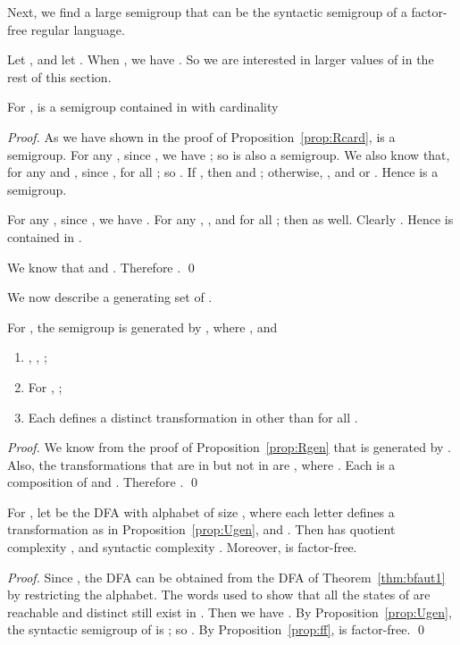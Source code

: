 \documentclass{llncs}
\newcommand{\be}{\begin{enumerate}}
\newcommand{\ee}{\end{enumerate}}
\begin{document}
Next, we find a large semigroup that can be the syntactic semigroup of a factor-free regular language. 

Let , and let . When , we have . So we are interested in larger values of  in the rest of this section. 

\begin{proposition}\label{prop:Uncard}
For ,  is a semigroup contained in  with cardinality 

\end{proposition}

\begin{proof}

As we have shown in the proof of Proposition~\ref{prop:Rcard},  is a semigroup. For any , since , we have ; so  is also a semigroup. We also know that, for any  and , since ,  for all ; so . If , then  and ; otherwise, , and  or . Hence  is a semigroup. 

For any , since , we have . For any , , and  for all ; then  as well. Clearly . Hence  is contained in . 

We know that  and . Therefore . \qed
\end{proof}

We now describe a generating set of . 
\begin{proposition}\label{prop:Ugen} 
For , the semigroup  is generated by , where , and 
\be
\item , , ; 
\item For , ; 
\item Each  defines a distinct transformation in  other than  for all .
\ee
\end{proposition}

\begin{proof} 
We know from the proof of Proposition~\ref{prop:Rgen} that  is generated by . Also, the transformations that are in  but not in  are , where . Each  is a composition of  and . Therefore . \qed
\end{proof}

\begin{theorem}\label{thm:ffaut} 
For , let  be the DFA with alphabet  of size , where each letter defines a transformation as in Proposition~\ref{prop:Ugen}, and . Then  has quotient complexity , and syntactic complexity . Moreover,  is factor-free. 
\end{theorem}

\begin{proof} 
Since , the DFA  can be obtained from the DFA  of Theorem~\ref{thm:bfaut1} by restricting the alphabet. The words used to show that all the states of  are reachable and distinct still exist in . Then we have . By Proposition~\ref{prop:Ugen}, the syntactic semigroup of  is ; so . By Proposition~\ref{prop:ff},  is factor-free. \qed
\end{proof}
\end{document}
